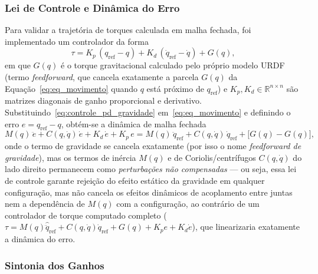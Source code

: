 \subsubsection{Lei de Controle e Dinâmica do Erro}

Para validar a trajetória de torques calculada em malha fechada, foi
implementado um controlador da forma
\begin{equation}
\tau = K_p\,(q_{\text{ref}} - q) + K_d\,(\dot{q}_{\text{ref}} - \dot{q}) + G(q),
\label{eq:controle_pd_gravidade}
\end{equation}
em que $G(q)$ é o torque gravitacional calculado pelo próprio modelo URDF
(termo \textit{feedforward}, que cancela exatamente a parcela $G(q)$ da
Equação~\eqref{eq:eq_movimento} quando $q$ está próximo de $q_{\text{ref}}$)
e $K_p, K_d \in \mathbb{R}^{n\times n}$ são matrizes diagonais de ganho
proporcional e derivativo. Substituindo~\eqref{eq:controle_pd_gravidade}
em~\eqref{eq:eq_movimento} e definindo o erro $e = q_{\text{ref}} - q$,
obtém-se a dinâmica de malha fechada
\begin{equation}
M(q)\,\ddot{e} + C(q,\dot q)\,\dot e + K_d\,\dot e + K_p\,e
= M(q)\,\ddot{q}_{\text{ref}} + C(q,\dot q)\,\dot q_{\text{ref}}
+ \big[G(q) - G(q)\big],
\label{eq:dinamica_erro}
\end{equation}
onde o termo de gravidade se cancela exatamente (por isso o nome
\textit{feedforward de gravidade}), mas os termos de inércia $M(q)$ e de
Coriolis/centrífugos $C(q,\dot q)$ do lado direito permanecem como
\emph{perturbações não compensadas} — ou seja, essa lei de controle
garante rejeição do efeito estático da gravidade em qualquer configuração,
mas não cancela os efeitos dinâmicos de acoplamento entre juntas nem a
dependência de $M(q)$ com a configuração, ao contrário de um controlador
de torque computado completo ($\tau = M(q)\hat{\ddot q}_{\text{ref}} +
C(q,\dot q)\dot q_{\text{ref}} + G(q) + K_p e + K_d \dot e$), que
linearizaria exatamente a dinâmica do erro.

\subsubsection{Sintonia dos Ganhos}

